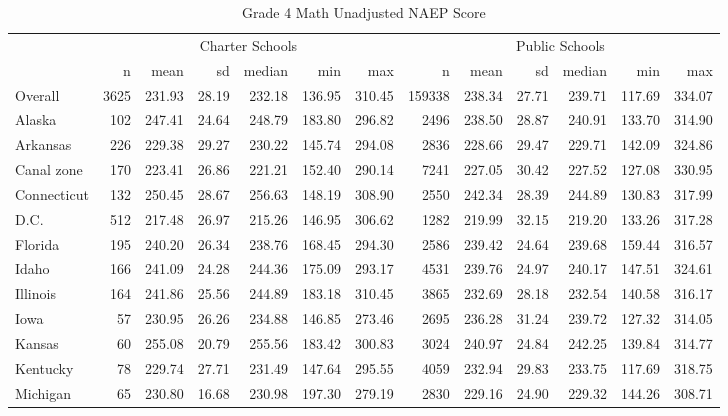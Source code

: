 \begin{sidewaystable}[ht]
\centering
\caption{Grade 4 Math Unadjusted NAEP Score} 
\label{tab:g4math-unadjscore}
\begin{tabular}{lrrrrrr@{\extracolsep{10pt}}rrrrrr}
  \hline & \multicolumn{6}{c}{Charter Schools} & \multicolumn{6}{c}{Public Schools} \\ \cline{2-7} \cline{8-13} & n & mean & sd & median & min & max & n & mean & sd & median & min & max \\ 
  \hline
Overall & 3625 & 231.93 & 28.19 & 232.18 & 136.95 & 310.45 & 159338 & 238.34 & 27.71 & 239.71 & 117.69 & 334.07 \\ 
  Alaska & 102 & 247.41 & 24.64 & 248.79 & 183.80 & 296.82 & 2496 & 238.50 & 28.87 & 240.91 & 133.70 & 314.90 \\ 
  Arkansas & 226 & 229.38 & 29.27 & 230.22 & 145.74 & 294.08 & 2836 & 228.66 & 29.47 & 229.71 & 142.09 & 324.86 \\ 
  Canal zone & 170 & 223.41 & 26.86 & 221.21 & 152.40 & 290.14 & 7241 & 227.05 & 30.42 & 227.52 & 127.08 & 330.95 \\ 
  Connecticut & 132 & 250.45 & 28.67 & 256.63 & 148.19 & 308.90 & 2550 & 242.34 & 28.39 & 244.89 & 130.83 & 317.99 \\ 
  D.C. & 512 & 217.48 & 26.97 & 215.26 & 146.95 & 306.62 & 1282 & 219.99 & 32.15 & 219.20 & 133.26 & 317.28 \\ 
  Florida & 195 & 240.20 & 26.34 & 238.76 & 168.45 & 294.30 & 2586 & 239.42 & 24.64 & 239.68 & 159.44 & 316.57 \\ 
  Idaho & 166 & 241.09 & 24.28 & 244.36 & 175.09 & 293.17 & 4531 & 239.76 & 24.97 & 240.17 & 147.51 & 324.61 \\ 
  Illinois & 164 & 241.86 & 25.56 & 244.89 & 183.18 & 310.45 & 3865 & 232.69 & 28.18 & 232.54 & 140.58 & 316.17 \\ 
  Iowa &  57 & 230.95 & 26.26 & 234.88 & 146.85 & 273.46 & 2695 & 236.28 & 31.24 & 239.72 & 127.32 & 314.05 \\ 
  Kansas &  60 & 255.08 & 20.79 & 255.56 & 183.42 & 300.83 & 3024 & 240.97 & 24.84 & 242.25 & 139.84 & 314.77 \\ 
  Kentucky &  78 & 229.74 & 27.71 & 231.49 & 147.64 & 295.55 & 4059 & 232.94 & 29.83 & 233.75 & 117.69 & 318.75 \\ 
  Michigan &  65 & 230.80 & 16.68 & 230.98 & 197.30 & 279.19 & 2830 & 229.16 & 24.90 & 229.32 & 144.26 & 308.71 \\ 

\end{tabular}
\end{sidewaystable}
